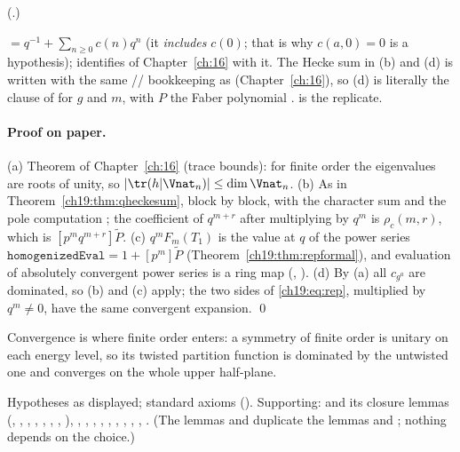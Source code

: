 (.)
\begin{dictionary}
 $=q^{-1}+\sum_{n\ge0}c(n)q^n$ (it \emph{includes} $c(0)$; that is why $c(a,0)=0$ is a hypothesis);
 identifies  of Chapter~\ref{ch:16} with it.  The Hecke sum in
(b) and (d) is written with the same // bookkeeping as
 (Chapter~\ref{ch:16}), so (d) is literally the clause of  for $g$ and $m$,
with $P$ the Faber polynomial .   is the replicate.
\end{dictionary}
\paragraph{Proof on paper.}  (a) Theorem of Chapter~\ref{ch:16} (trace bounds): for finite order the eigenvalues are roots of
unity, so $|\tr(h|\Vnat_n)|\le\dim\Vnat_n$.  (b) As in Theorem~\ref{ch19:thm:qheckesum}, block by block, with the character sum
 and the pole computation ; the coefficient of $q^{m+r}$ after multiplying by
$q^m$ is $\rho_c(m,r)$, which is $[p^mq^{m+r}]\tilde P$.  (c) $q^mF_m(T_1)$ is the value at $q$ of the power series
$\mathtt{homogenizedEval}=1+[p^m]\tilde P$ (Theorem~\ref{ch19:thm:repformal}), and evaluation of absolutely convergent power
series is a ring map (, ).  (d) By (a) all $c_{g^a}$ are dominated, so (b)
and (c) apply; the two sides of \eqref{ch19:eq:rep}, multiplied by $q^m\ne0$, have the same convergent expansion. \qed
\begin{physics}
Convergence is where finite order enters: a symmetry of finite order is unitary on each energy level, so its twisted
partition function is dominated by the untwisted one and converges on the whole upper half-plane.
\end{physics}
\begin{status}Hypotheses as displayed; standard axioms ().  Supporting:
 and its closure lemmas (, , , , ,
, , ), , , ,
, , , ,
, , .  (The lemmas
 and  duplicate the lemmas  and
; nothing depends on the choice.)\end{status}

